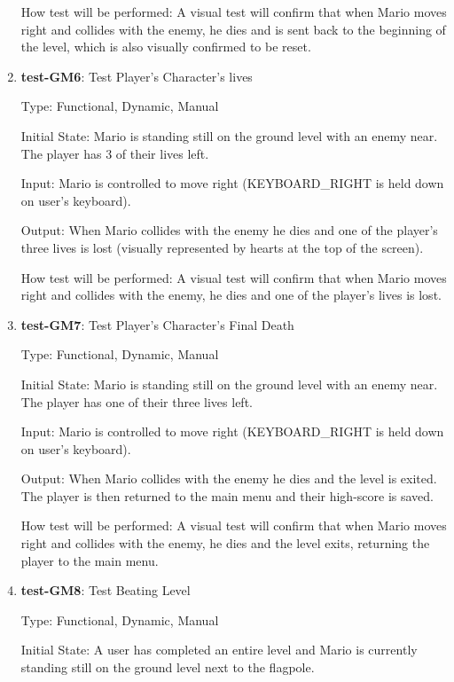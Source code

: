 \documentclass[12pt, titlepage]{article}
\begin{document}
\begin{enumerate}
How test will be performed: A visual test will confirm that when Mario moves right and collides with the enemy, he dies and is sent back to the beginning of the level, which is also visually confirmed to be reset.

\item{\textbf{test-GM6}: Test Player's Character's lives\\}

Type: Functional, Dynamic, Manual

Initial State: Mario is standing still on the ground level with an enemy near. The player has 3 of their lives left.
					
Input: Mario is controlled to move right (KEYBOARD\_RIGHT is held down on user's keyboard).
					
Output: When Mario collides with the enemy he dies and one of the player's three lives is lost (visually represented by hearts at the top of the screen).
					
How test will be performed: A visual test will confirm that when Mario moves right and collides with the enemy, he dies and one of the player's lives is lost.

\item{\textbf{test-GM7}: Test Player's Character's Final Death\\}

Type: Functional, Dynamic, Manual

Initial State: Mario is standing still on the ground level with an enemy near. The player has one of their three lives left.
					
Input: Mario is controlled to move right (KEYBOARD\_RIGHT is held down on user's keyboard).
					
Output: When Mario collides with the enemy he dies and the level is exited. The player is then returned to the main menu and their high-score is saved.
					
How test will be performed: A visual test will confirm that when Mario moves right and collides with the enemy, he dies and the level exits, returning the player to the main menu.

\item{\textbf{test-GM8}: Test Beating Level\\}

Type: Functional, Dynamic, Manual

Initial State: A user has completed an entire level and Mario is currently standing still on the ground level next to the flagpole.
					

\end{enumerate}
\end{document}
